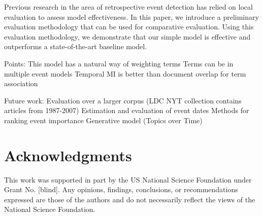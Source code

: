 \documentclass{sig-alternate}
\begin{document}
Previous research in the area of retrospective event detection has relied on local evaluation to assess model effectiveness. In this paper, we introduce a preliminary evaluation methodology that can be used for comparative evaluation. Using this evaluation methodology, we demonstrate that our simple model is effective and outperforms a state-of-the-art baseline model.

Points:
This model has a natural way of weighting terms
Terms can be in multiple event models
Temporal MI is better than document overlap for term association	


Future work:
Evaluation over a larger corpus (LDC NYT collection contains articles from 1987-2007)
Estimation and evaluation of event dates
Methods for ranking event importance
Generative model (Topics over Time)

\section{Acknowledgments}
This work was supported in part by the US National Science Foundation under Grant No. [blind]. Any opinions, findings, conclusions, or recommendations expressed are those of the authors and do not necessarily reflect the views of the National Science Foundation.



  
\end{document}
